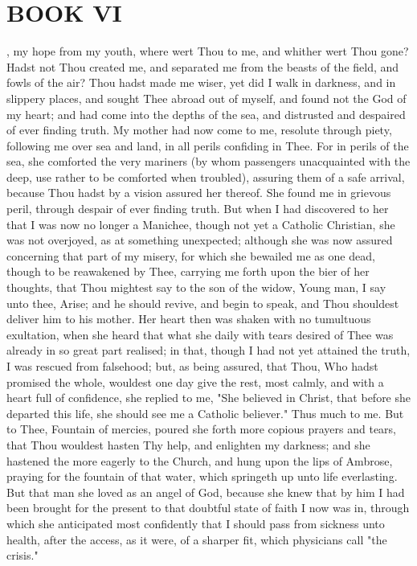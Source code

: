 \documentclass[b5paper,openright,12pt,twoside]{book}
\begin{document}
\chapter{BOOK VI}


, my hope from my youth, where wert Thou to me, and whither wert
Thou gone? Hadst not Thou created me, and separated me from the beasts
of the field, and fowls of the air? Thou hadst made me wiser, yet did I
walk in darkness, and in slippery places, and sought Thee abroad out of
myself, and found not the God of my heart; and had come into the depths
of the sea, and distrusted and despaired of ever finding truth. My
mother had now come to me, resolute through piety, following me over sea
and land, in all perils confiding in Thee. For in perils of the sea, she
comforted the very mariners (by whom passengers unacquainted with the
deep, use rather to be comforted when troubled), assuring them of a safe
arrival, because Thou hadst by a vision assured her thereof. She found
me in grievous peril, through despair of ever finding truth. But when
I had discovered to her that I was now no longer a Manichee, though
not yet a Catholic Christian, she was not overjoyed, as at something
unexpected; although she was now assured concerning that part of my
misery, for which she bewailed me as one dead, though to be reawakened
by Thee, carrying me forth upon the bier of her thoughts, that Thou
mightest say to the son of the widow, Young man, I say unto thee, Arise;
and he should revive, and begin to speak, and Thou shouldest deliver him
to his mother. Her heart then was shaken with no tumultuous exultation,
when she heard that what she daily with tears desired of Thee was
already in so great part realised; in that, though I had not yet
attained the truth, I was rescued from falsehood; but, as being assured,
that Thou, Who hadst promised the whole, wouldest one day give the rest,
most calmly, and with a heart full of confidence, she replied to me,
"She believed in Christ, that before she departed this life, she should
see me a Catholic believer." Thus much to me. But to Thee, Fountain
of mercies, poured she forth more copious prayers and tears, that Thou
wouldest hasten Thy help, and enlighten my darkness; and she hastened
the more eagerly to the Church, and hung upon the lips of Ambrose,
praying for the fountain of that water, which springeth up unto life
everlasting. But that man she loved as an angel of God, because she knew
that by him I had been brought for the present to that doubtful state of
faith I now was in, through which she anticipated most confidently that
I should pass from sickness unto health, after the access, as it were,
of a sharper fit, which physicians call "the crisis."
\end{document}
